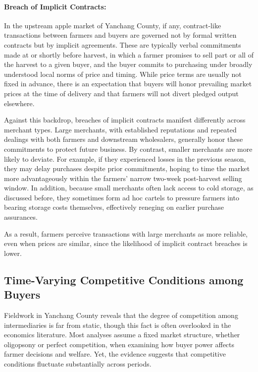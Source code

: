 \paragraph{Breach of Implicit Contracts:}
In the upstream apple market of Yanchang County, if any, contract-like transactions between farmers and buyers are governed not by formal written contracts but by implicit agreements. These are typically verbal commitments made at or shortly before harvest, in which a farmer promises to sell part or all of the harvest to a given buyer, and the buyer commits to purchasing under broadly understood local norms of price and timing. While price terms are usually not fixed in advance, there is an expectation that buyers will honor prevailing market prices at the time of delivery and that farmers will not divert pledged output elsewhere.

Against this backdrop, breaches of implicit contracts manifest differently across merchant types. Large merchants, with established reputations and repeated dealings with both farmers and downstream wholesalers, generally honor these commitments to protect future business. By contrast, smaller merchants are more likely to deviate. For example, if they experienced losses in the previous season, they may delay purchases despite prior commitments, hoping to time the market more advantageously within the farmers' narrow two-week post-harvest selling window. In addition, because small merchants often lack access to cold storage, as discussed before, they sometimes form ad hoc cartels to pressure farmers into bearing storage costs themselves, effectively reneging on earlier purchase assurances.  

As a result, farmers perceive transactions with large merchants as more reliable, even when prices are similar, since the likelihood of implicit contract breaches is lower.









\subsection{Time-Varying Competitive Conditions among Buyers}
\noindent 
Fieldwork in Yanchang County reveals that the degree of competition among intermediaries is far from static, though this fact is often overlooked in the economics literature. Most analyses assume a fixed market structure, whether oligopsony or perfect competition, when examining how buyer power affects farmer decisions and welfare. Yet, the evidence suggests that competitive conditions fluctuate substantially across periods.  

